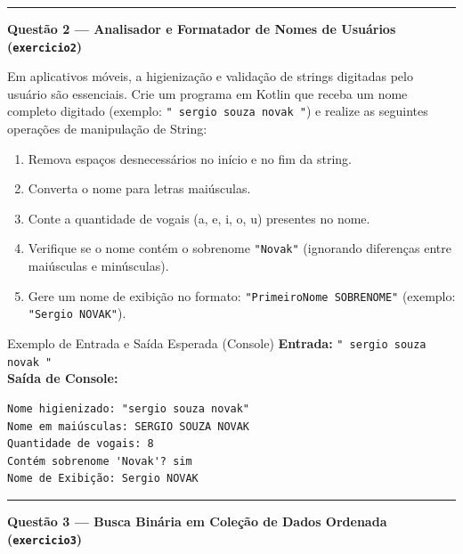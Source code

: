 \documentclass[12pt]{article}
\begin{document}
\vspace{0.6cm}
\noindent\rule{\textwidth}{0.8pt}
\vspace{0.4cm}

\noindent\textbf{Questão 2 — Analisador e Formatador de Nomes de Usuários (\texttt{exercicio2})}

\vspace{0.2cm}
\noindent
Em aplicativos móveis, a higienização e validação de strings digitadas pelo usuário são essenciais. Crie um programa em Kotlin que receba um nome completo digitado (exemplo: \texttt{"  sergio souza novak  "}) e realize as seguintes operações de manipulação de String:
\begin{enumerate}[label=\alph*), leftmargin=1.5em]
  \item Remova espaços desnecessários no início e no fim da string.
  \item Converta o nome para letras maiúsculas.
  \item Conte a quantidade de vogais (a, e, i, o, u) presentes no nome.
  \item Verifique se o nome contém o sobrenome \texttt{"Novak"} (ignorando diferenças entre maiúsculas e minúsculas).
  \item Gere um nome de exibição no formato: \texttt{"PrimeiroNome SOBRENOME"} (exemplo: \texttt{"Sergio NOVAK"}).
\end{enumerate}

\vspace{0.2cm}
\begin{block}{Exemplo de Entrada e Saída Esperada (Console)}
\textbf{Entrada:} \texttt{"  sergio souza novak  "}\\
\textbf{Saída de Console:}
\begin{verbatim}
Nome higienizado: "sergio souza novak"
Nome em maiúsculas: SERGIO SOUZA NOVAK
Quantidade de vogais: 8
Contém sobrenome 'Novak'? sim
Nome de Exibição: Sergio NOVAK
\end{verbatim}
\end{block}

\vspace{0.6cm}
\noindent\rule{\textwidth}{0.8pt}
\vspace{0.4cm}

\noindent\textbf{Questão 3 — Busca Binária em Coleção de Dados Ordenada (\texttt{exercicio3})}
\end{document}
